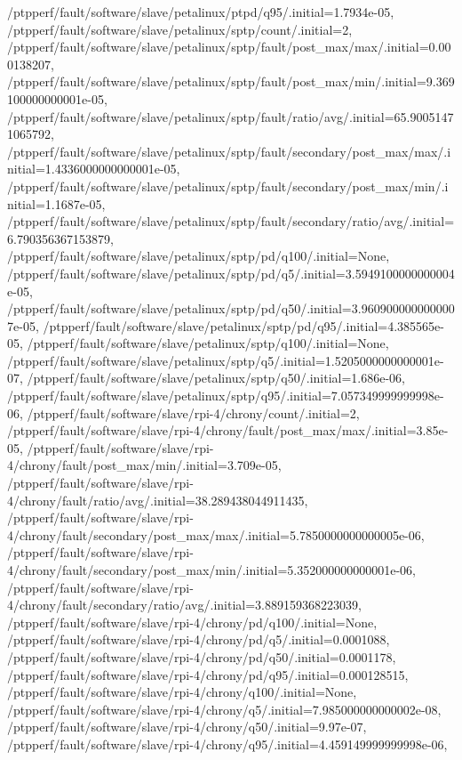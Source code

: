 {    /ptpperf/fault/software/slave/petalinux/ptpd/q95/.initial=1.7934e-05,
    /ptpperf/fault/software/slave/petalinux/sptp/count/.initial=2,
    /ptpperf/fault/software/slave/petalinux/sptp/fault/post_max/max/.initial=0.000138207,
    /ptpperf/fault/software/slave/petalinux/sptp/fault/post_max/min/.initial=9.369100000000001e-05,
    /ptpperf/fault/software/slave/petalinux/sptp/fault/ratio/avg/.initial=65.90051471065792,
    /ptpperf/fault/software/slave/petalinux/sptp/fault/secondary/post_max/max/.initial=1.4336000000000001e-05,
    /ptpperf/fault/software/slave/petalinux/sptp/fault/secondary/post_max/min/.initial=1.1687e-05,
    /ptpperf/fault/software/slave/petalinux/sptp/fault/secondary/ratio/avg/.initial=6.790356367153879,
    /ptpperf/fault/software/slave/petalinux/sptp/pd/q100/.initial=None,
    /ptpperf/fault/software/slave/petalinux/sptp/pd/q5/.initial=3.5949100000000004e-05,
    /ptpperf/fault/software/slave/petalinux/sptp/pd/q50/.initial=3.9609000000000007e-05,
    /ptpperf/fault/software/slave/petalinux/sptp/pd/q95/.initial=4.385565e-05,
    /ptpperf/fault/software/slave/petalinux/sptp/q100/.initial=None,
    /ptpperf/fault/software/slave/petalinux/sptp/q5/.initial=1.5205000000000001e-07,
    /ptpperf/fault/software/slave/petalinux/sptp/q50/.initial=1.686e-06,
    /ptpperf/fault/software/slave/petalinux/sptp/q95/.initial=7.057349999999998e-06,
    /ptpperf/fault/software/slave/rpi-4/chrony/count/.initial=2,
    /ptpperf/fault/software/slave/rpi-4/chrony/fault/post_max/max/.initial=3.85e-05,
    /ptpperf/fault/software/slave/rpi-4/chrony/fault/post_max/min/.initial=3.709e-05,
    /ptpperf/fault/software/slave/rpi-4/chrony/fault/ratio/avg/.initial=38.289438044911435,
    /ptpperf/fault/software/slave/rpi-4/chrony/fault/secondary/post_max/max/.initial=5.7850000000000005e-06,
    /ptpperf/fault/software/slave/rpi-4/chrony/fault/secondary/post_max/min/.initial=5.352000000000001e-06,
    /ptpperf/fault/software/slave/rpi-4/chrony/fault/secondary/ratio/avg/.initial=3.889159368223039,
    /ptpperf/fault/software/slave/rpi-4/chrony/pd/q100/.initial=None,
    /ptpperf/fault/software/slave/rpi-4/chrony/pd/q5/.initial=0.0001088,
    /ptpperf/fault/software/slave/rpi-4/chrony/pd/q50/.initial=0.0001178,
    /ptpperf/fault/software/slave/rpi-4/chrony/pd/q95/.initial=0.000128515,
    /ptpperf/fault/software/slave/rpi-4/chrony/q100/.initial=None,
    /ptpperf/fault/software/slave/rpi-4/chrony/q5/.initial=7.985000000000002e-08,
    /ptpperf/fault/software/slave/rpi-4/chrony/q50/.initial=9.97e-07,
    /ptpperf/fault/software/slave/rpi-4/chrony/q95/.initial=4.459149999999998e-06,
}
